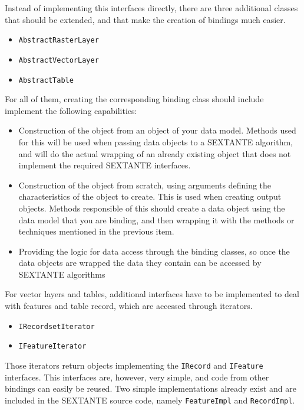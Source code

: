Instead of implementing this interfaces directly, there are three additional classes that should be extended, and that make the creation of bindings much easier.

\begin{itemize}
 \item \texttt{AbstractRasterLayer}
\item \texttt{AbstractVectorLayer}
\item \texttt{AbstractTable}
\end{itemize}

For all of them, creating the corresponding binding class should include implement the following capabilities:

\begin{itemize}
 \item Construction of the object from an object of your data model. Methods used for this will be used when passing data objects to a SEXTANTE algorithm, and will do the actual wrapping of an already existing object that does not implement the required SEXTANTE interfaces.
\item Construction of the object from scratch, using arguments defining the characteristics of the object to create. This is used when creating output objects. Methods responsible of this should create a data object using the data model that you are binding, and then wrapping it with the methods or techniques mentioned in the previous item.
\item Providing the logic for data access through the binding classes, so once the data objects are wrapped the data they contain can be accessed by SEXTANTE algorithms
\end{itemize}

For vector layers and tables, additional interfaces have to be implemented to deal with features and table record, which are accessed through iterators. 

\begin{itemize}
 \item \texttt{IRecordsetIterator}
\item \texttt{IFeatureIterator}
\end{itemize}

Those iterators return objects implementing the \texttt{IRecord} and \texttt{IFeature} interfaces. This interfaces are, however, very simple, and code from other bindings can easily be reused. Two simple implementations already exist and are included in the SEXTANTE source code, namely \texttt{FeatureImpl} and \texttt{RecordImpl}.

